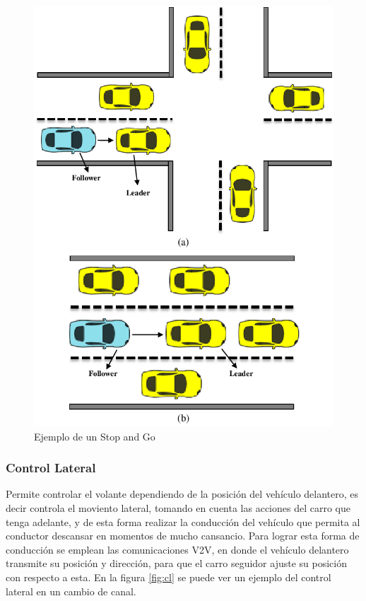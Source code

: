 \begin{figure}[!h]
	\centering
		\includegraphics[scale=0.8]{Imagenes/stg}
		\caption{Ejemplo de un Stop and Go \cite{marzbanrad2015prediction}}
		\label{fig:stg}
	\end{figure}	

 
\subsubsection{Control Lateral}

Permite controlar el volante dependiendo de la posición del vehículo delantero, es decir controla el moviento lateral, tomando en cuenta las acciones del carro que tenga adelante, y de esta forma realizar la conducción del vehículo que permita al conductor descansar en momentos de mucho cansancio. Para lograr esta forma de conducción se emplean las comunicaciones V2V, en donde el vehículo delantero transmite su posición y dirección, para que el carro seguidor ajuste su posición con respecto a esta. En la figura \ref{fig:cl} se puede ver un ejemplo del control lateral en un cambio de canal.\\


